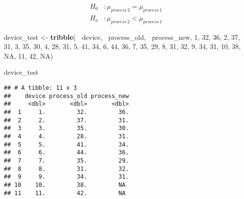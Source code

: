 \documentclass[]{book}
\newenvironment{Shaded}{\begin{snugshade}}{\end{snugshade}}
\newcommand{\DecValTok}[1]{\textcolor[rgb]{0.00,0.00,0.81}{#1}}
\newcommand{\KeywordTok}[1]{\textcolor[rgb]{0.13,0.29,0.53}{\textbf{#1}}}
\newcommand{\NormalTok}[1]{#1}
\newcommand{\OperatorTok}[1]{\textcolor[rgb]{0.81,0.36,0.00}{\textbf{#1}}}
\newcommand{\OtherTok}[1]{\textcolor[rgb]{0.56,0.35,0.01}{#1}}
\newcommand{\StringTok}[1]{\textcolor[rgb]{0.31,0.60,0.02}{#1}}
\theoremstyle{definition}
\theoremstyle{definition}
\theoremstyle{definition}
\theoremstyle{remark}
\begin{document}
\[ \begin{aligned}
H_0 &:  \mu_{process \, 2} = \mu_{process \, 1} \\
H_a &:  \mu_{process \, 2} < \mu_{process \, 1}
\end{aligned} \]

\begin{Shaded}
\begin{Highlighting}[]
\NormalTok{device_test <-}\StringTok{ }\KeywordTok{tribble}\NormalTok{(}
\OperatorTok{~}\NormalTok{device, }\OperatorTok{~}\NormalTok{process_old, }\OperatorTok{~}\NormalTok{process_new,}
\DecValTok{1}\NormalTok{, }\DecValTok{32}\NormalTok{, }\DecValTok{36}\NormalTok{,}
\DecValTok{2}\NormalTok{, }\DecValTok{37}\NormalTok{, }\DecValTok{31}\NormalTok{,}
\DecValTok{3}\NormalTok{, }\DecValTok{35}\NormalTok{, }\DecValTok{30}\NormalTok{,}
\DecValTok{4}\NormalTok{, }\DecValTok{28}\NormalTok{, }\DecValTok{31}\NormalTok{,}
\DecValTok{5}\NormalTok{, }\DecValTok{41}\NormalTok{, }\DecValTok{34}\NormalTok{,}
\DecValTok{6}\NormalTok{, }\DecValTok{44}\NormalTok{, }\DecValTok{36}\NormalTok{,}
\DecValTok{7}\NormalTok{, }\DecValTok{35}\NormalTok{, }\DecValTok{29}\NormalTok{,}
\DecValTok{8}\NormalTok{, }\DecValTok{31}\NormalTok{, }\DecValTok{32}\NormalTok{,}
\DecValTok{9}\NormalTok{, }\DecValTok{34}\NormalTok{, }\DecValTok{31}\NormalTok{,}
\DecValTok{10}\NormalTok{, }\DecValTok{38}\NormalTok{, }\OtherTok{NA}\NormalTok{,}
\DecValTok{11}\NormalTok{, }\DecValTok{42}\NormalTok{, }\OtherTok{NA}\NormalTok{)}

\NormalTok{device_test}
\end{Highlighting}
\end{Shaded}

\begin{verbatim}
## # A tibble: 11 x 3
##    device process_old process_new
##     <dbl>       <dbl>       <dbl>
##  1     1.         32.         36.
##  2     2.         37.         31.
##  3     3.         35.         30.
##  4     4.         28.         31.
##  5     5.         41.         34.
##  6     6.         44.         36.
##  7     7.         35.         29.
##  8     8.         31.         32.
##  9     9.         34.         31.
## 10    10.         38.         NA 
## 11    11.         42.         NA
\end{verbatim}

\begin{Shaded}
\end{Shaded}
\end{document}
